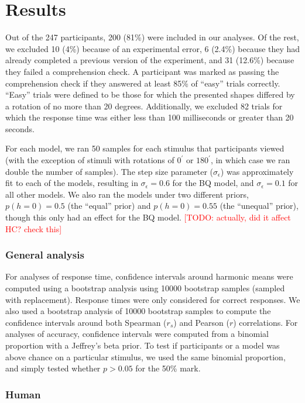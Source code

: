\documentclass[10pt,letterpaper]{article}
\newcommand{\TODO}[1]{\textcolor{red}{[TODO: #1]}}
\newcommand{\Bq}[0]{BQ}
\begin{document}
\section{Results}

Out of the 247 participants, 200 (81\%) were included in our
analyses. Of the rest, we excluded 10 (4\%) because of an experimental
error, 6 (2.4\%) because they had already completed a previous version
of the experiment, and 31 (12.6\%) because they failed a comprehension
check. A participant was marked as passing the comprehension check if
they answered at least 85\% of ``easy'' trials correctly. ``Easy''
trials were defined to be those for which the presented shapes
differed by a rotation of no more than 20 degrees. Additionally, we
excluded 82 trials for which the response time was either less than
100 milliseconds or greater than 20 seconds.

For each model, we ran 50 samples for each stimulus that participants
viewed (with the exception of stimuli with rotations of $0^\prime$ or
$180^\prime$, in which case we ran double the number of samples). The
step size parameter ($\sigma_\epsilon$) was approximately fit to each
of the models, resulting in $\sigma_\epsilon=0.6$ for the \Bq{} model,
and $\sigma_\epsilon=0.1$ for all other models. We also ran the models
under two different priors, $p(h=0)=0.5$ (the ``equal'' prior) and
$p(h=0)=0.55$ (the ``unequal'' prior), though this only had an effect
for the \Bq{} model. \TODO{actually, did it affect HC?  check this}

\subsubsection{General analysis}

For analyses of response time, confidence intervals around harmonic
means were computed using a bootstrap analysis using 10000 bootstrap
samples (sampled with replacement). Response times were only
considered for correct responses.  We also used a bootstrap analysis
of 10000 bootstrap samples to compute the confidence intervals around
both Spearman ($r_s$) and Pearson ($r$) correlations.  For analyses of
accuracy, confidence intervals were computed from a binomial
proportion with a Jeffrey's beta prior.  To test if participants or a
model was above chance on a particular stimulus, we used the same
binomial proportion, and simply tested whether $p>0.05$ for the 50\%
mark.

\subsubsection{Human}
\end{document}
